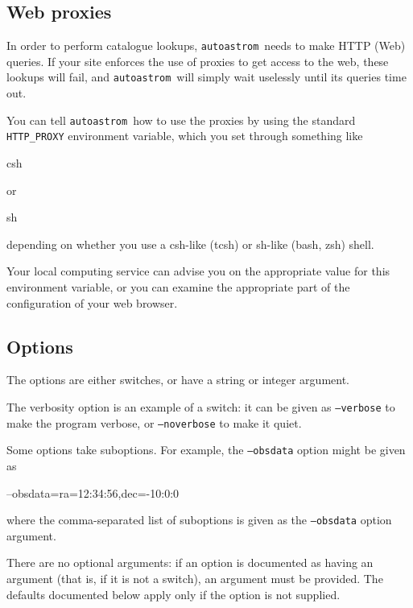 \documentclass[twoside,11pt,nolof]{starlink}
\providecommand{\autoastrom}{\texttt{autoastrom}}
\begin{document}
\subsection{Web proxies\label{sb:webproxies}}

In order to perform catalogue lookups, \autoastrom\ needs to make HTTP (Web)
queries.  If your site enforces the use of proxies to get access to the web,
these lookups will fail, and \autoastrom\ will simply wait uselessly until its
queries time out.

You can tell \autoastrom\ how to use the proxies by using the standard
\texttt{HTTP\_PROXY} environment variable, which you set through something
like

\begin{terminalv}
csh%
\end{terminalv}
or
\begin{terminalv}
sh%
\end{terminalv}
depending on whether you use a csh-like (tcsh) or sh-like (bash, zsh) shell.

Your local computing service can advise you on the appropriate value for this
environment variable, or you can examine the appropriate part of the
configuration of your web browser.

\subsection{Options\label{sb:options}}

The options are either switches, or have a string or integer argument.

The verbosity option is an example of a switch: it can be given as
\texttt{--verbose} to make the program verbose, or \texttt{--noverbose} to
make it quiet.

Some options take suboptions.  For example, the \texttt{--obsdata} option
might be given as

\begin{terminalv}
--obsdata=ra=12:34:56,dec=-10:0:0
\end{terminalv}

where the comma-separated list of suboptions is given as the
\texttt{--obsdata} option argument.

There are no optional arguments: if an option is documented as having an
argument (that is, if it is not a switch), an argument must be provided.  The
defaults documented below apply only if the option is not supplied.
\end{document}
